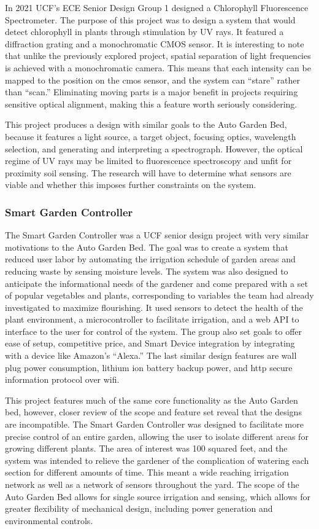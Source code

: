 In 2021 UCF’s ECE Senior Design Group 1 designed a Chlorophyll Fluorescence Spectrometer. The purpose of this project was to design a system that would detect chlorophyll in plants through stimulation by UV rays. It featured a diffraction grating and a monochromatic CMOS sensor. It is interesting to note that unlike the previously explored project, spatial separation of light frequencies is achieved with a monochromatic camera. This means that each intensity can be mapped to the position on the cmos sensor, and the system can “stare” rather than “scan.” Eliminating moving parts is a major benefit in projects requiring sensitive optical alignment, making this a feature worth seriously considering.

This project produces a design with similar goals to the Auto Garden Bed, because it features a light source, a target object, focusing optics, wavelength selection, and generating and interpreting a spectrograph. However, the optical regime of UV rays may be limited to fluorescence spectroscopy and unfit for proximity soil sensing. The research will have to determine what sensors are viable and whether this imposes further constraints on the system.

\subsubsection{Smart Garden Controller}

The Smart Garden Controller was a UCF senior design project with very similar motivations to the Auto Garden Bed. The goal was to create a system that reduced user labor by automating the irrigation schedule of garden areas and reducing waste by sensing moisture levels. The system was also designed to anticipate the informational needs of the gardener and come prepared with a set of popular vegetables and plants, corresponding to variables the team had already investigated to maximize flourishing. It used sensors to detect the health of the plant environment, a microcontroller to facilitate irrigation, and a web API to interface to the user for control of the system. The group also set goals to offer ease of setup, competitive price, and Smart Device integration by integrating with a device like Amazon’s “Alexa.” The last similar design features are wall plug power consumption, lithium ion battery backup power, and http secure information protocol over wifi.

This project features much of the same core functionality as the Auto Garden bed, however, closer review of the scope and feature set reveal that the designs are incompatible. The Smart Garden Controller was designed to facilitate more precise control of an entire garden, allowing the user to isolate different areas for growing different plants. The area of interest was 100 squared feet, and the system was intended to relieve the gardener of the complication of watering each section for different amounts of time. This meant a wide reaching irrigation network as well as a network of sensors throughout the yard. The scope of the Auto Garden Bed allows for single source irrigation and sensing, which allows for greater flexibility of mechanical design, including power generation and environmental controls.

